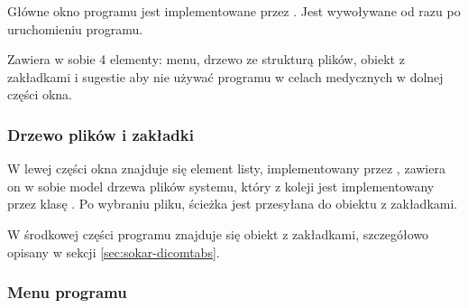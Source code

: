 \label{sec:sokar-window}

\par
Główne okno programu jest implementowane przez .
Jest wywoływane od razu po uruchomieniu programu.
\par
Zawiera w sobie 4 elementy: menu, drzewo ze strukturą plików, obiekt z zakładkami  i sugestie aby nie używać programu w celach medycznych w dolnej części okna.

\subsubsection{Drzewo plików i zakładki}

\par
W lewej części okna znajduje się element listy, implementowany przez , zawiera on w sobie model drzewa plików systemu, który z koleji jest implementowany przez klasę .
Po wybraniu pliku, ścieżka jest przesyłana do obiektu z zakładkami.
\par
W środkowej części programu znajduje się obiekt z zakładkami, szczegółowo opisany w sekcji \ref{sec:sokar-dicomtabs}.

\subsubsection{Menu programu}
\label{sec:sokar-window-menu}

